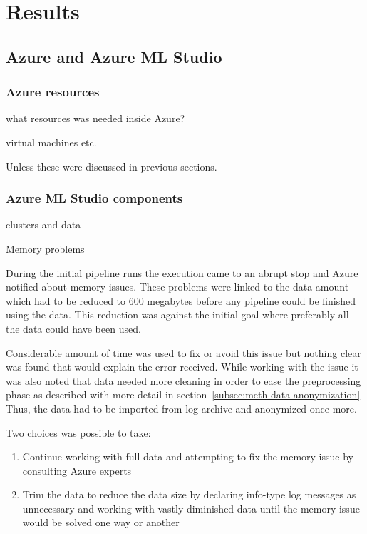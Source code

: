 

\section{Results}\label{sec:results}


\subsection{Azure and Azure ML Studio}\label{subsec:azure-and-azure-ml-studio}

\subsubsection*{Azure resources}
\begin{itcomment}
    what resources was needed inside Azure?

    virtual machines etc.

    Unless these were discussed in previous sections.
\end{itcomment}


\subsubsection*{Azure ML Studio components}
\begin{itcomment}
    clusters and data

    Memory problems
\end{itcomment}

During the initial pipeline runs
the execution came to an abrupt stop
and Azure notified about memory issues.
These problems were linked to the data amount
which had to be reduced to 600 megabytes
before any pipeline could be finished using the data.
This reduction was against the initial goal
where preferably all the data could have been used.

Considerable amount of time was used
to fix or avoid this issue
but nothing clear was found
that would explain the error received.
While working with the issue
it was also noted
that data needed more cleaning
in order to ease the preprocessing phase
as described with more detail in section~\ref{subsec:meth-data-anonymization}
Thus,
the data had to be imported from log archive
and anonymized once more.

Two choices was possible to take:
\begin{enumerate}
    \item Continue working with full data
    and attempting to fix the memory issue
    by consulting Azure experts
    \item  Trim the data to reduce the data size
    by declaring info-type log messages
    as unnecessary
    and working with vastly diminished data
    until the memory issue would be solved
    one way or another
\end{enumerate}

